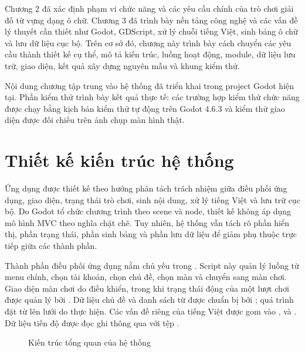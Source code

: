 \documentclass[../DoAn.tex]{subfiles}
\begin{document}
Chương 2 đã xác định phạm vi chức năng và các yêu cầu chính của trò chơi giải đố từ vựng dạng ô chữ. Chương 3 đã trình bày nền tảng công nghệ và các vấn đề lý thuyết cần thiết như Godot, GDScript, xử lý chuỗi tiếng Việt, sinh bảng ô chữ và lưu dữ liệu cục bộ. Trên cơ sở đó, chương này trình bày cách chuyển các yêu cầu thành thiết kế cụ thể, mô tả kiến trúc, luồng hoạt động, module, dữ liệu lưu trữ, giao diện, kết quả xây dựng nguyên mẫu và khung kiểm thử.

Nội dung chương tập trung vào hệ thống đã triển khai trong project Godot hiện tại. Phần kiểm thử trình bày kết quả thực tế: các trường hợp kiểm thử chức năng được chạy bằng kịch bản kiểm thử tự động trên Godot 4.6.3 và kiểm thử giao diện được đối chiếu trên ảnh chụp màn hình thật.

\section{Thiết kế kiến trúc hệ thống}
\label{section:4.1}

Ứng dụng được thiết kế theo hướng phân tách trách nhiệm giữa điều phối ứng dụng, giao diện, trạng thái trò chơi, sinh nội dung, xử lý tiếng Việt và lưu trữ cục bộ. Do Godot tổ chức chương trình theo scene và node, thiết kế không áp dụng mô hình MVC theo nghĩa chặt chẽ. Tuy nhiên, hệ thống vẫn tách rõ phần hiển thị, phần trạng thái, phần sinh bảng và phần lưu dữ liệu để giảm phụ thuộc trực tiếp giữa các thành phần.

Thành phần điều phối ứng dụng nằm chủ yếu trong . Script này quản lý luồng từ menu chính, chọn tài khoản, chọn chủ đề, chọn màn và chuyển sang màn chơi. Giao diện màn chơi do  điều khiển, trong khi trạng thái động của một lượt chơi được quản lý bởi . Dữ liệu chủ đề và danh sách từ được chuẩn bị bởi ; quá trình đặt từ lên lưới do  thực hiện. Các vấn đề riêng của tiếng Việt được gom vào ,  và . Dữ liệu tiến độ được đọc ghi thông qua  với tệp .

\begin{figure}[H]
\centering
\resizebox{0.95\textwidth}{!}{}
\caption{Kiến trúc tổng quan của hệ thống}
\label{fig:kien-truc-he-thong}
\end{figure}
\end{document}
